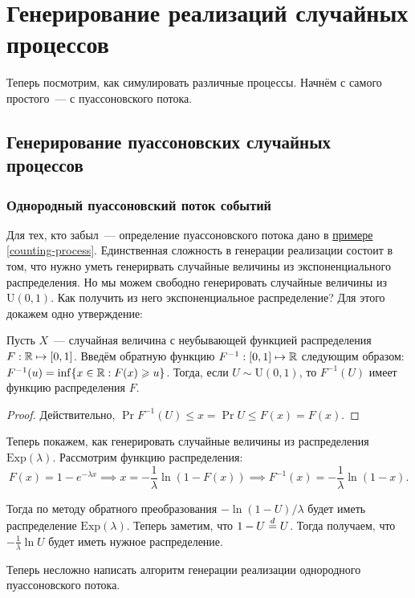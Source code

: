 \section{Генерирование реализаций случайных процессов}
Теперь посмотрим, как симулировать различные процессы. Начнём с самого 
простого~--- с пуассоновского потока.
\subsection{Генерирование пуассоновских случайных процессов}
\subsubsection{Однородный пуассоновский поток событий}
Для тех, кто забыл~--- определение пуассоновского потока дано в 
\hyperref[counting-process]{примере \ref*{counting-process}}. Единственная 
сложность в генерации реализации состоит в том, что нужно уметь генерирвать 
случайные величины из экспоненциального распределения. Но мы можем свободно 
генерировать случайные величины из \(\mathrm{U}(0, 1)\). Как получить из него 
экспоненциальное распределение? Для этого докажем одно утверждение:
\begin{lemma}
	Пусть \(X\)~--- случайная величина с неубывающей функцией распределения \(F 
	: \mathbb{R} \mapsto [0, 1]\). Введём обратную функцию \(F^{-1} : [0, 1] \mapsto 
	\mathbb{R}\) следующим образом: \(F^{-1}(u) = \inf\{x \in \mathbb{R}: F(x) \geqslant u\}\). 
	Тогда, если \(U \sim \mathrm{U}(0, 1)\), то \(F^{-1}(U)\) имеет функцию 
	распределения \(F\).
\end{lemma}
\begin{proof}
	Действительно, \(\Pr{F^{-1}(U) \leq x} = \Pr{U \leq F(x)} = F(x)\).
\end{proof}

Теперь покажем, как генерировать случайные величины из распределения 
\(\mathrm{Exp}(\lambda)\). Рассмотрим функцию распределения:
\[
	F(x) = 1 - e^{-\lambda x} \implies x = -\frac{1}{\lambda}\ln(1 - F(x)) 
	\implies F^{-1}(x) = -\frac{1}{\lambda}\ln(1 - x).
\]

Тогда по методу обратного преобразования \(-\ln(1 - U)/\lambda\) будет иметь 
распределение \(\mathrm{Exp}(\lambda)\). Теперь заметим, что \(1 - U \overset{d}{=} 
U\). Тогда получаем, что \(-\frac{1}{\lambda}\ln{U}\) будет иметь нужное 
распределение.

Теперь несложно написать алгоритм генерации реализации однородного 
пуассоновского потока.

